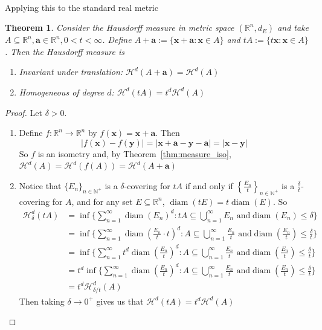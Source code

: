 \documentclass{article}
\theoremstyle{plain}
\newtheorem{thm}{Theorem}[section]
\theoremstyle{definition}
\DeclareMathOperator{\diam}{diam}
\theoremstyle{remark}
\begin{document}
~\\
Applying this to the standard real metric
\begin{thm}
    Consider the Hausdorff measure in metric space $(\mathbb{R}^n, d_E) $ and take $A  \subseteq \mathbb{R}^n, \mathbf{a}\in \mathbb{R}^n, 0<t<\infty$. Define $A+\mathbf{a}:=\{\mathbf{x}+\mathbf{a}:\mathbf{x}\in A\}$ and $tA := \{t\mathbf{x}:\mathbf{x}\in A\}$. Then the Hausdorff measure is
    \begin{enumerate}[label = (\arabic*)]
        \item Invariant under translation: $\mathcal{H}^d(A+\mathbf{a})=\mathcal{H}^d(A)$
        \item Homogeneous of degree $d$: $ \mathcal{H}^d(tA)=t^d\mathcal{H}^d(A)$
    \end{enumerate}
\end{thm}
\begin{proof}
    Let $\delta > 0$. 
    \begin{enumerate}[label = (\arabic*)]
        \item Define $f: \mathbb{R}^n \to \mathbb{R}^n$ by $f(\mathbf{x}) = \mathbf{x} + \mathbf{a}$. Then \[
        |f(\mathbf{x}) - f(\mathbf{y})| = |\mathbf{x} + \mathbf{a} - \mathbf{y} - \mathbf{a}| = |\mathbf{x} - \mathbf{y}|
        \]
        So $f$ is an isometry and, by Theorem~\ref{thm:measure_iso}, $\mathcal{H}^d(A) = \mathcal{H}^d(f(A)) = \mathcal{H}^d(A + \mathbf{a})$

      
      \item Notice that $\{E_n\}_{n\in \mathbb{N}^+}$ is a $\delta$-covering for $tA$ if and only if $\left \{ \displaystyle \frac{E_n}{t}\right\}_{n\in \mathbb{N}^+}$ is a $\displaystyle \frac{\delta}{t}$-covering for $A$, and for any set $E \subseteq \mathbb{R}^n$, $\diam (tE)=t\diam (E)$. So
      \begin{align*}
          \mathcal{H}^d_\delta(tA) & = \inf \bigg \{\sum \limits _{n =1}^\infty \diam (E_n)^d : tA \subseteq \bigcup \limits _{n=1}^\infty E_n \text { and}  \diam(E_n) \le \delta \bigg \} 
          \\ &= \inf \bigg \{\sum \limits _{n =1}^\infty \diam \left (\frac{E_n}{t} \cdot t \right)^d : A \subseteq \bigcup \limits _{n=1}^\infty \frac{E_n}{t} \text { and}  \diam \left(\frac{E_n}{t}\right) \le \frac{\delta}{t} \bigg \}
          \\ &= \inf \bigg \{\sum \limits _{n =1}^\infty t^d\diam \left (\frac{E_n}{t} \right)^d : A \subseteq \bigcup \limits _{n=1}^\infty \frac{E_n}{t} \text { and}  \diam \left(\frac{E_n}{t}\right) \le \frac{\delta}{t} \bigg \}
          \\ &= t^d \inf \bigg \{\sum \limits _{n =1}^\infty \diam \left (\frac{E_n}{t} \right)^d : A \subseteq \bigcup \limits _{n=1}^\infty \frac{E_n}{t} \text { and}  \diam \left(\frac{E_n}{t}\right) \le \frac{\delta}{t} \bigg \}
          \\ &= t^d\mathcal{H}_{\delta / t} ^d(A)
      \end{align*}
        Then taking $\delta \to 0^+$ gives us that $\mathcal{H}^d(tA) = t^d\mathcal{H}^d(A)$
    \end{enumerate}
\end{proof}
\end{document}
